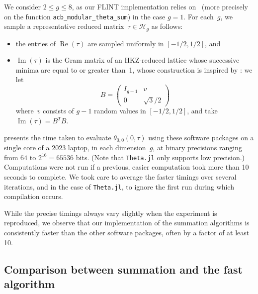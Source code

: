 \documentclass[12pt,oneside]{amsart}
\numberwithin{equation}{section}
\theoremstyle{definition}
\newcommand{\Half}{\mathcal{H}}
\DeclareMathOperator{\im}{Im}
\DeclareMathOperator{\re}{Re}
\begin{document}
We consider $2\leq g\leq 8$, as our FLINT implementation relies
on~\cite{engeShortAdditionSequences2018} (more precisely on the function
\texttt{acb\_modular\_theta\_sum}) in the case $g=1$. For each~$g$, we sample a
representative reduced matrix~$\tau\in \Half_g$ as follows:
\begin{itemize}
\item the entries of $\re(\tau)$ are sampled uniformly in $[-1/2,1/2]$, and
\item $\im(\tau)$ is the Gram matrix of an HKZ-reduced lattice whose successive
  minima are equal to or greater than~1, whose construction is inspired by
  \cite[Rem.~3.1]{lagariasKorkinZolotarevBasesSuccessive1990}: we let
  \begin{displaymath}
    B =
    \begin{pmatrix}
      I_{g-1} & v\\ 0 & \sqrt{3}/2
    \end{pmatrix}
  \end{displaymath}
  where~$v$ consists of $g-1$ random values in $[-1/2,1/2]$, and take~$\im(\tau) = B^T B$.
\end{itemize}

 presents the time taken to evaluate
$\theta_{0,0}(0,\tau)$ using these software packages on a single core of a 2023
laptop, in each dimension~$g$, at binary precisions ranging from $64$ to
$2^{16} = 65536$ bits. (Note that \texttt{Theta.jl} only supports low
precision.) Computations were not run if a previous, easier computation took
more than 10 seconds to complete. We took care to average the faster timings
over several iterations, and in the case of \texttt{Theta.jl}, to ignore the
first run during which compilation occurs.

While the precise timings always vary slightly when the experiment is
reproduced, we observe that our implementation of the summation algorithms is
consistently faster than the other software packages, often by a factor of at
least 10.

\subsection{Comparison between summation and the fast algorithm}
\label{subsec:ql-compare}
\end{document}
